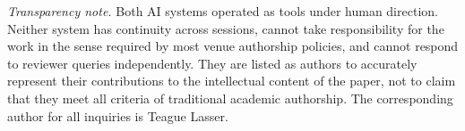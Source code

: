 \medskip
\noindent\emph{Transparency note.}
Both AI systems operated as tools under human direction.
Neither system has continuity across sessions, cannot take
responsibility for the work in the sense required by most
venue authorship policies, and cannot respond to reviewer
queries independently.  They are listed as authors to
accurately represent their contributions to the intellectual
content of the paper, not to claim that they meet all criteria
of traditional academic authorship.  The corresponding author
for all inquiries is Teague Lasser.

